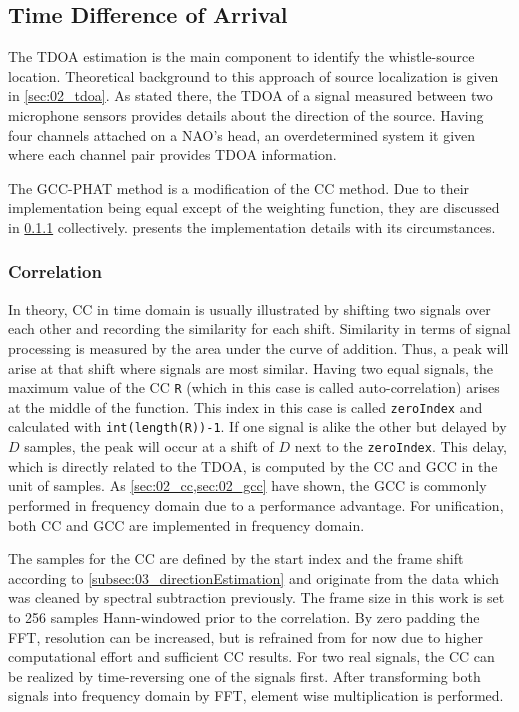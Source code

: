 \subsection{Time Difference of Arrival}
\label{subsec:03_tdoa}

The \ac{TDOA} estimation is the main component to identify the
whistle-source location.
Theoretical background to this approach of source localization is
given in \cref{sec:02_tdoa}.
As stated there, the \ac{TDOA} of a signal measured between two microphone sensors
provides details about the direction of the source.
Having four channels attached on a NAO's head, an overdetermined system it
given where each channel pair provides \ac{TDOA} information.

The \ac{GCC-PHAT} method is a modification of the \ac{CC} method.
Due to their implementation being equal except of the weighting function,
they are discussed in \cref{subsubsec:03_cc} collectively.
 presents the implementation details with its
circumstances.

\subsubsection{Correlation}
\label{subsubsec:03_cc}

In theory, \acf{CC} in time domain is usually illustrated by shifting
two signals over each other and recording the similarity for each shift.
Similarity in terms of signal processing is measured by the area under the curve of addition.
Thus, a peak will arise at that shift where signals are most similar.
Having two equal signals, the maximum value of the \ac{CC} \lstinline!R! (which in this case
is called auto-correlation) arises at the middle of the function.
This index in this case is called \lstinline!zeroIndex! and calculated with
\lstinline!int(length(R))-1!.
If one signal is alike the other but delayed by $D$ samples, the peak will
occur at a shift of $D$ next to the \lstinline!zeroIndex!.
This delay, which is directly related to the \ac{TDOA}, is computed
by the \ac{CC} and \ac{GCC} in the unit of samples.
As \cref{sec:02_cc,sec:02_gcc} have shown, the \ac{GCC} is commonly performed
in frequency domain due to a performance advantage.
For unification, both \ac{CC} and \ac{GCC} are implemented in frequency domain.

The samples for the \ac{CC} are defined by the start index and the frame shift
according to \cref{subsec:03_directionEstimation} and originate from the data which was
cleaned by spectral subtraction previously.
The frame size in this work is set to 256 samples Hann-windowed prior to the correlation.
By zero padding the \ac{FFT}, resolution can be increased, but is refrained from for now
due to higher computational effort and sufficient \ac{CC} results.
For two real signals, the \ac{CC} can be realized by time-reversing one of the signals first.
After transforming both signals into frequency domain by \ac{FFT}, element wise multiplication is performed.

